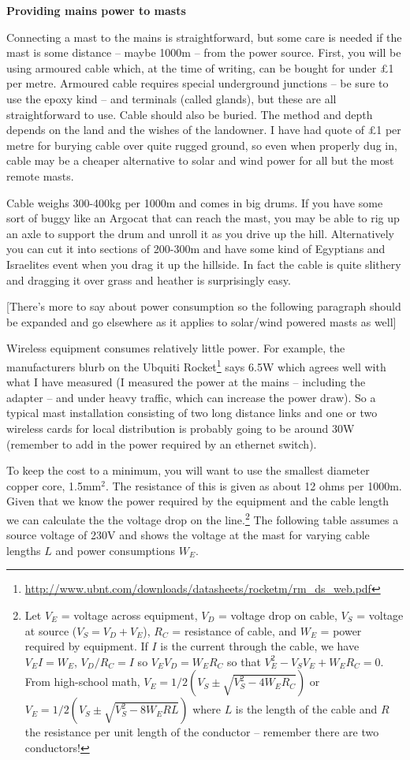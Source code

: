 \documentclass{article}
\begin{document}
\large
\begin{center}
{\bf Providing mains power to masts}
\end{center}

Connecting a mast to the mains  is straightforward, but some care is
needed if the mast is some distance -- maybe 1000m -- from the power
source.  First, you will be using armoured cable which, at the time of
writing, can be bought for  under \pounds1 per metre. Armoured
cable requires special underground junctions -- be sure to use the
epoxy kind --  and terminals (called
glands), but these are all straightforward to use.  Cable should also
be buried. The method and depth depends on the land and the
wishes of the landowner. I have had quote of \pounds1 per metre for
burying cable over quite rugged ground, so even when properly dug in,
cable may be a cheaper alternative to solar and wind power for all but
the most remote masts.

Cable weighs 300-400kg per 1000m and comes in big drums.  If you have
some sort of buggy like an Argocat that can reach the mast, you may be
able to rig up an axle to support the drum and unroll it as you drive
up the hill.  Alternatively you can cut it into sections of 200-300m
and have some kind of Egyptians and Israelites event when you drag it
up the hillside.  In fact the cable is quite slithery and dragging it
over grass and heather is surprisingly easy.

[There's more to say about power consumption so the following
  paragraph should be expanded and go elsewhere as it applies to
  solar/wind powered masts as well]

Wireless equipment consumes relatively little power. For example, the
manufacturers blurb on the Ubquiti
Rocket\footnote{\url{http://www.ubnt.com/downloads/datasheets/rocketm/rm_ds_web.pdf}}
says 6.5W which agrees well with what I have measured (I measured the
power at the mains -- including the adapter -- and under heavy
traffic, which can increase the power draw).  So a typical mast installation
consisting of two long distance links and one or two wireless cards
for local distribution is probably going to be around 30W (remember to add in the
power required by an ethernet switch).

To keep the cost  to a minimum, you will want to use the smallest
diameter copper core, 1.5mm$^2$.  The resistance of this is given as
about 12 ohms per 1000m.  Given that we know the power required by the
equipment and the cable length we can calculate the the
voltage drop on the line.\footnote{
Let
$V_E$ = voltage across equipment,
$V_D$ = voltage drop on cable,
$V_S$ = voltage at source ($V_S = V_D + V_E$),
$R_C$ = resistance of cable, and
$W_E$ = power required by equipment.
If $I$ is the current through the cable, we have $V_EI  = W_E$, $V_D/R_C
= I$ so $V_EV_D = W_ER_C$  so that $V_E^2 - V_SV_E + W_ER_C = 0$.
From high-school math, $V_E = 1/2(V_S \pm \sqrt{V_S^2 -4W_ER_C})$ or
$V_E = 1/2(V_S \pm \sqrt{V_S^2 -8W_ERL})$ where $L$ is the length of
the cable and $R$ the resistance per unit length of the conductor --
remember there are two conductors!}
The following table assumes a source voltage of 230V and shows the
voltage at the mast for varying cable lengths $L$ and power
consumptions $W_E$.
\end{document}
